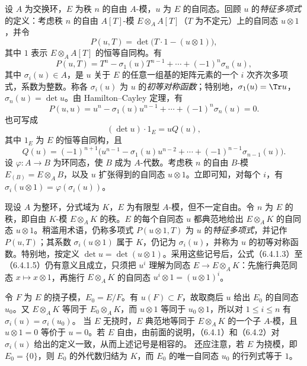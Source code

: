 设 $A$ 为交换环，$E$ 为秩 $n$ 的自由 $A$-模，$u$ 为 $E$ 的自同态。回顾 $u$ 的\emph{特征多项式}的定义：考虑秩 $n$ 的自由 $A[T]$-模 $E\otimes_A A[T]$（$T$ 为不定元）上的自同态 $u\otimes1$，并令
\begin{equation}\tag{6.4.1.1}
P(u,T)=\det\bigl(T\cdot1-(u\otimes1)\bigr),
\end{equation}
其中 $1$ 表示 $E\otimes_A A[T]$ 的恒等自同构。有
\begin{equation}\tag{6.4.1.2}
P(u,T)=T^n-\sigma_1(u)T^{n-1}+\cdots+(-1)^n\sigma_n(u),
\end{equation}
其中 $\sigma_i(u)\in A$，是 $u$ 关于 $E$ 的任意一组基的矩阵元素的一个 $i$ 次齐次多项式，系数为整数。称各 $\sigma_i(u)$ 为 $u$ 的\emph{初等对称函数}；特别地，$\sigma_1(u)=\Tr u$，$\sigma_n(u)=\det u$。由 Hamilton--Cayley 定理，有
\begin{equation}\tag{6.4.1.3}
P(u,u)=u^n-\sigma_1(u)u^{n-1}+\cdots+(-1)^n\sigma_n(u)=0.
\end{equation}
也可写成
\begin{equation}\tag{6.4.1.4}
(\det u)\cdot1_E=uQ(u),
\end{equation}
其中 $1_E$ 为 $E$ 的恒等自同构，且
\begin{equation}\tag{6.4.1.5}
Q(u)=(-1)^{n+1}\bigl(u^{n-1}-\sigma_1(u)u^{n-2}+\cdots+(-1)^{n-1}\sigma_{n-1}(u)\bigr).
\end{equation}
设 $\varphi:A\to B$ 为环同态，使 $B$ 成为 $A$-代数。考虑秩 $n$ 的自由 $B$-模 $E_{(B)}=E\otimes_A B$，以及 $u$ 扩张得到的自同态 $u\otimes1$。立即可知，对每个 $i$，有 $\sigma_i(u\otimes1)=\varphi(\sigma_i(u))$。

现设 $A$ 为整环，分式域为 $K$，$E$ 为有限型 $A$-模，但不一定自由。令 $n$ 为 $E$ 的秩，即自由 $K$-模 $E\otimes_A K$ 的秩。$E$ 的每个自同态 $u$ 都典范地给出 $E\otimes_A K$ 的自同态 $u\otimes1$。稍滥用术语，仍称多项式 $P(u\otimes1,T)$ 为 $u$ 的\emph{特征多项式}，并记作 $P(u,T)$；其系数 $\sigma_i(u\otimes1)$ 属于 $K$，仍记为 $\sigma_i(u)$，并称为 $u$ 的初等对称函数。特别地，按定义 $\det u=\det(u\otimes1)$。采用这些记号后，公式（6.4.1.3）至（6.4.1.5）仍有意义且成立，只须把 $u^i$ 理解为同态 $E\to E\otimes_A K$：先施行典范同态 $x\mapsto x\otimes1$，再施行 $E\otimes_A K$ 的自同态 $u^i\otimes1=(u\otimes1)^i$。

令 $F$ 为 $E$ 的挠子模，$E_0=E/F$。有 $u(F)\subset F$，故取商后 $u$ 给出 $E_0$ 的自同态 $u_0$。又 $E\otimes_A K$ 等同于 $E_0\otimes_A K$，而 $u\otimes1$ 等同于 $u_0\otimes1$，所以对 $1\leq i\leq n$ 有 $\sigma_i(u)=\sigma_i(u_0)$。
当 $E$ 无挠时，$E$ 典范地等同于 $E\otimes_A K$ 的一个子 $A$-模，且 $u\otimes1=0$ 等价于 $u=0$。若 $E$ 自由，由前面的说明，（6.4.1）和（6.4.2）对 $\sigma_i(u)$ 给出的定义一致，从而上述记号是相容的。
还应注意，若 $E$ 为挠模，即 $E_0=\{0\}$，则 $E_0$ 的外代数归结为 $K$，而 $E_0$ 的唯一自同态 $u_0$ 的行列式等于 $1$。

